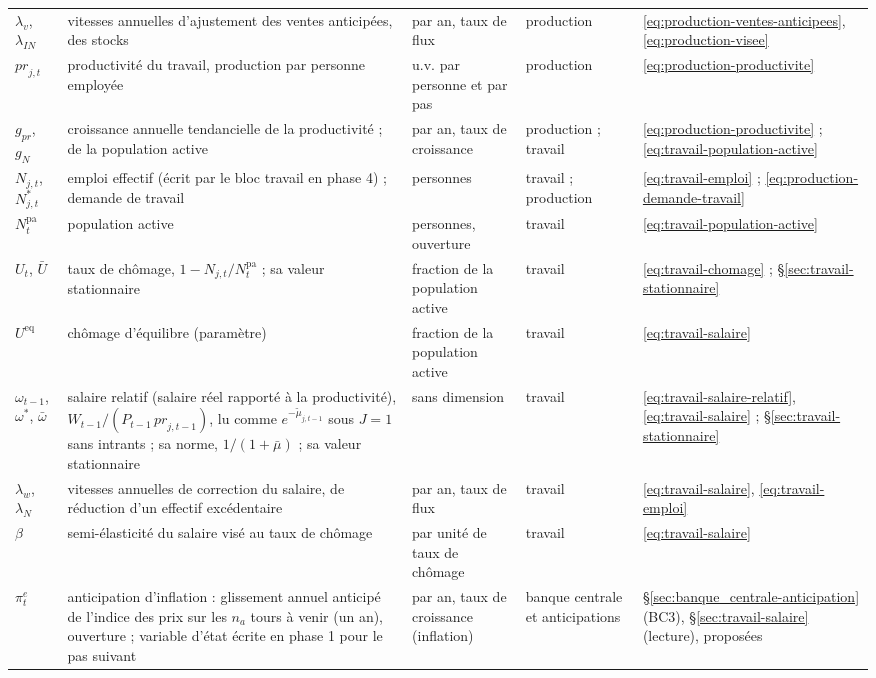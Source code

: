 \documentclass[11pt,a4paper]{article}
\begin{document}
\begin{center}
\begin{longtable}{>{\raggedright\arraybackslash}p{1.6cm}>{\raggedright\arraybackslash}p{5.6cm}>{\raggedright\arraybackslash}p{2.0cm}>{\raggedright\arraybackslash}p{2.2cm}>{\raggedright\arraybackslash}p{2.8cm}}
$\lambda_v$, $\lambda_{\mathit{IN}}$ & vitesses annuelles d'ajustement des ventes anticipées, des stocks & par an, taux de flux & production & \eqref{eq:production-ventes-anticipees}, \eqref{eq:production-visee}\\
$\mathit{pr}_{j,t}$ & productivité du travail, production par personne employée & u.v. par personne et par pas & production & \eqref{eq:production-productivite}\\
$g_{\mathit{pr}}$, $g_N$ & croissance annuelle tendancielle de la productivité ; de la population active & par an, taux de croissance & production ; travail & \eqref{eq:production-productivite} ; \eqref{eq:travail-population-active}\\
$N_{j,t}$, $N^{\ast}_{j,t}$ & emploi effectif (écrit par le bloc travail en phase 4) ; demande de travail & personnes & travail ; production & \eqref{eq:travail-emploi} ; \eqref{eq:production-demande-travail}\\
$N^{\mathrm{pa}}_t$ & population active & personnes, ouverture & travail & \eqref{eq:travail-population-active}\\
$U_t$, $\bar U$ & taux de chômage, $1 - N_{j,t}/N^{\mathrm{pa}}_t$ ; sa valeur stationnaire & fraction de la population active & travail & \eqref{eq:travail-chomage} ; \S\ref{sec:travail-stationnaire}\\
$U^{\mathrm{eq}}$ & chômage d'équilibre (paramètre) & fraction de la population active & travail & \eqref{eq:travail-salaire}\\
$\omega_{t-1}$, $\omega^{\ast}$, $\bar\omega$ & salaire relatif (salaire réel rapporté à la productivité), $W_{t-1}/(P_{t-1}\,\mathit{pr}_{j,t-1})$, lu comme $e^{-\tilde\mu_{j,t-1}}$ sous $J = 1$ sans intrants ; sa norme, $1/(1 + \bar\mu)$ ; sa valeur stationnaire & sans dimension & travail & \eqref{eq:travail-salaire-relatif}, \eqref{eq:travail-salaire} ; \S\ref{sec:travail-stationnaire}\\
$\lambda_w$, $\lambda_N$ & vitesses annuelles de correction du salaire, de réduction d'un effectif excédentaire & par an, taux de flux & travail & \eqref{eq:travail-salaire}, \eqref{eq:travail-emploi}\\
$\beta$ & semi-élasticité du salaire visé au taux de chômage & par unité de taux de chômage & travail & \eqref{eq:travail-salaire}\\
$\pi^e_t$ & anticipation d'inflation : glissement annuel anticipé de l'indice des prix sur les $n_a$ tours à venir (un an), ouverture ; variable d'état écrite en phase 1 pour le pas suivant & par an, taux de croissance (inflation) & banque centrale et anticipations & \S\ref{sec:banque_centrale-anticipation} (BC3), \S\ref{sec:travail-salaire} (lecture), proposées\\

\end{longtable}
\end{center}
\end{document}
